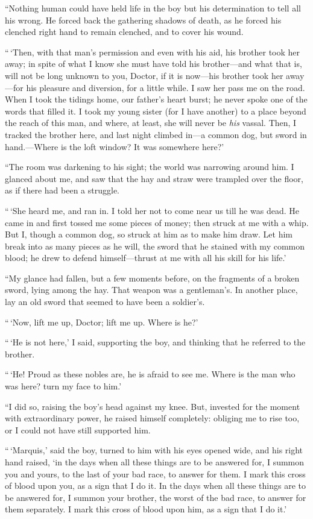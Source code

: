 ``Nothing human could have held life in the boy but his determination
to tell all his wrong.  He forced back the gathering shadows of death,
as he forced his clenched right hand to remain clenched, and to cover
his wound.

``\,`Then, with that man's permission and even with his aid, his brother
took her away; in spite of what I know she must have told his
brother---and what that is, will not be long unknown to you, Doctor,
if it is now---his brother took her away---for his pleasure and
diversion, for a little while.  I saw her pass me on the road.
When I took the tidings home, our father's heart burst; he never
spoke one of the words that filled it.  I took my young sister (for
I have another) to a place beyond the reach of this man, and where,
at least, she will never be \emph{his} vassal.  Then, I tracked the
brother here, and last night climbed in---a common dog, but sword in
hand.---Where is the loft window?  It was somewhere here?'

``The room was darkening to his sight; the world was narrowing around
him.  I glanced about me, and saw that the hay and straw were
trampled over the floor, as if there had been a struggle.

``\,`She heard me, and ran in.  I told her not to come near us till he
was dead.  He came in and first tossed me some pieces of money; then
struck at me with a whip.  But I, though a common dog, so struck at
him as to make him draw.  Let him break into as many pieces as he
will, the sword that he stained with my common blood; he drew to
defend himself---thrust at me with all his skill for his life.'

``My glance had fallen, but a few moments before, on the fragments of
a broken sword, lying among the hay.  That weapon was a gentleman's.
In another place, lay an old sword that seemed to have been a soldier's.

``\,`Now, lift me up, Doctor; lift me up.  Where is he?'

``\,`He is not here,' I said, supporting the boy, and thinking that he
referred to the brother.

``\,`He!  Proud as these nobles are, he is afraid to see me.  Where is
the man who was here?  turn my face to him.'

``I did so, raising the boy's head against my knee.  But, invested for
the moment with extraordinary power, he raised himself completely:
obliging me to rise too, or I could not have still supported him.

``\,`Marquis,' said the boy, turned to him with his eyes opened wide,
and his right hand raised, `in the days when all these things are to
be answered for, I summon you and yours, to the last of your bad race,
to answer for them.  I mark this cross of blood upon you, as a sign
that I do it.  In the days when all these things are to be answered
for, I summon your brother, the worst of the bad race, to answer for
them separately. I mark this cross of blood upon him, as a sign that
I do it.'

